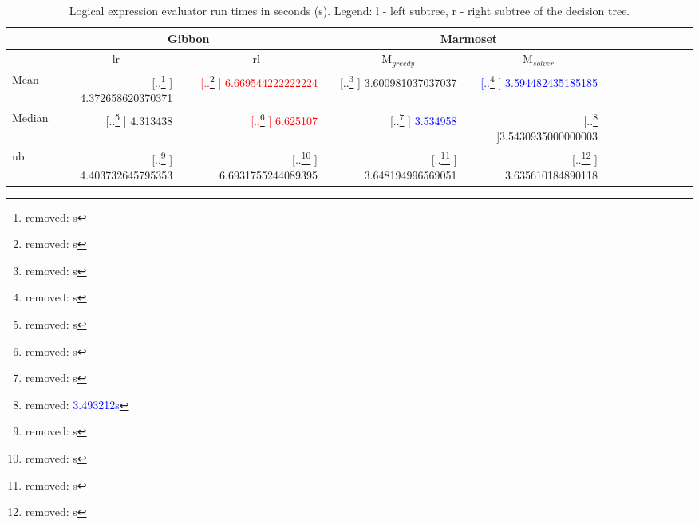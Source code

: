 \documentclass[acmsmall,review,anonymous]{acmart}\settopmatter{printfolios=true,printccs=false,printacmref=false}
\newcommand{\system}{{\sc Marmoset}\xspace}
\newcommand{\systemSolver}{{\sc M$_{\mathit{solver}}$}\xspace} %
\newcommand{\systemGreedy}{{\sc M$_{\mathit{greedy}}$}\xspace} %
\newcommand{\gibbon}{{\sc Gibbon}\xspace}
\newcommand{\ra}[1]{\renewcommand{\arraystretch}{#1}}
\newcommand{\snum}[1]{{\num[round-precision=3,round-mode=figures,scientific-notation=true,output-exponent-marker = e]{#1}}}
\newcommand{\fnumthree}[1]{ {\num[round-mode=places,round-precision=3, scientific-notation=false]{#1}}}
\providecommand{\DIFaddtex}[1]{{\protect\color{blue} \sf #1}} %
\providecommand{\DIFdeltex}[1]{{\protect\color{red} [..\footnote{removed: #1} ]}} %
\providecommand{\DIFaddFL}[1]{\DIFadd{#1}} %
\providecommand{\DIFdelFL}[1]{\DIFdel{#1}} %
\providecommand{\DIFaddbeginFL}{} %
\providecommand{\DIFaddendFL}{} %
\providecommand{\DIFdelbeginFL}{} %
\providecommand{\DIFdelendFL}{} %
\providecommand{\DIFadd}[1]{\texorpdfstring{\DIFaddtex{#1}}{#1}} %
\providecommand{\DIFdel}[1]{\texorpdfstring{\DIFdeltex{#1}}{}} %
\newcommand{\DIFscaledelfig}{0.5}
\newlength{\DIFdelgraphicswidth} %
\newlength{\DIFdelgraphicsheight} %
\newcommand{\DIFaddincludegraphics}[2][]{{\color{blue}\fbox{\DIFOincludegraphics[#1]{#2}}}} %
\newcommand{\DIFdelincludegraphics}[2][]{%
\sbox{\DIFdelgraphicsbox}{\DIFOincludegraphics[#1]{#2}}%
\settoboxwidth{\DIFdelgraphicswidth}{\DIFdelgraphicsbox} %
\settoboxtotalheight{\DIFdelgraphicsheight}{\DIFdelgraphicsbox} %
\scalebox{\DIFscaledelfig}{%
\parbox[b]{\DIFdelgraphicswidth}{\usebox{\DIFdelgraphicsbox}\\[-\baselineskip] \rule{\DIFdelgraphicswidth}{0em}}\llap{\resizebox{\DIFdelgraphicswidth}{\DIFdelgraphicsheight}{%
\setlength{\unitlength}{\DIFdelgraphicswidth}%
\begin{picture}(1,1)%
\thicklines\linethickness{2pt} %
{\color[rgb]{1,0,0}\put(0,0){\framebox(1,1){}}}%
{\color[rgb]{1,0,0}\put(0,0){\line( 1,1){1}}}%
{\color[rgb]{1,0,0}\put(0,1){\line(1,-1){1}}}%
\end{picture}%
}\hspace*{3pt}}} %
} %
\DeclareRobustCommand{\DIFaddbeginFL}{\DIFOaddbeginFL \let\includegraphics\DIFaddincludegraphics} %
\DeclareRobustCommand{\DIFaddendFL}{\DIFOaddendFL \let\includegraphics\DIFOincludegraphics} %
\DeclareRobustCommand{\DIFdelbeginFL}{\DIFOdelbeginFL \let\includegraphics\DIFdelincludegraphics} %
\DeclareRobustCommand{\DIFdelendFL}{\DIFOaddendFL \let\includegraphics\DIFOincludegraphics} %
\begin{document}
\begin{table}[]
	\setlength{\tabcolsep}{2pt} \centering
	\ra{1}
	\caption{Logical expression evaluator run times \DIFaddbeginFL \DIFaddFL{in seconds (s)}\DIFaddendFL .
	Legend: l - left subtree, r - right subtree  of the decision tree.}
	\begin{tabular}{@{}p{0.6in}rcrcrcrcrcrcrcr@{}}\toprule
	 & \multicolumn{3}{|c|}{{\gibbon}} &
	 & \multicolumn{3}{c|}{{\system}}\\ \midrule

	 & \multicolumn{1}{c}{{lr}} & 
	 & \multicolumn{1}{c}{{rl}} &
	 & \multicolumn{1}{c}{\small{\systemGreedy}} &
	 & \multicolumn{1}{c}{\small{\systemSolver}}\\ \midrule
	Mean
	         &   \DIFdelbeginFL %
\DIFdelFL{s
			 }\DIFdelendFL \DIFaddbeginFL \fnumthree{4.372658620370371}
			 \DIFaddendFL &&   \textcolor{red}{\DIFdelbeginFL %
\DIFdelFL{s}\DIFdelendFL \DIFaddbeginFL \fnumthree{6.669544222222224}\DIFaddendFL }
			 &&   \DIFdelbeginFL %
\DIFdelFL{s
			 }\DIFdelendFL \DIFaddbeginFL \fnumthree{3.600981037037037}
			 \DIFaddendFL &&   \textcolor{blue}{\DIFdelbeginFL %
\DIFdelFL{s}\DIFdelendFL \DIFaddbeginFL \fnumthree{3.594482435185185}\DIFaddendFL }

			\\
	Median
	        &  \DIFdelbeginFL %
\DIFdelFL{s
			}\DIFdelendFL \DIFaddbeginFL \fnumthree{4.313438}
			\DIFaddendFL &&   \textcolor{red}{\DIFdelbeginFL %
\DIFdelFL{s}\DIFdelendFL \DIFaddbeginFL \fnumthree{6.625107}\DIFaddendFL }
			&&    \DIFdelbeginFL %
\DIFdelFL{s
			}\DIFdelendFL \DIFaddbeginFL \DIFaddFL{\textcolor{blue}{\fnumthree{3.534958}}
			}\DIFaddendFL &&  \DIFdelbeginFL \DIFdelFL{\textcolor{blue}{\snum{3.493212}s}
}\DIFdelendFL \DIFaddbeginFL {\fnumthree{3.5430935000000003}}
\DIFaddendFL 

			\\
ub          
	               &    \DIFdelbeginFL %
\DIFdelFL{s
				   }\DIFdelendFL \DIFaddbeginFL \fnumthree{4.403732645795353}
				   \DIFaddendFL &&    \DIFdelbeginFL %
\DIFdelFL{s
				   }\DIFdelendFL \DIFaddbeginFL \fnumthree{6.6931755244089395}
				   \DIFaddendFL &&    \DIFdelbeginFL %
\DIFdelFL{s
				   }\DIFdelendFL \DIFaddbeginFL \fnumthree{3.648194996569051}
				   \DIFaddendFL &&    \DIFdelbeginFL %
\DIFdelFL{s
}\DIFdelendFL \DIFaddbeginFL \fnumthree{3.635610184890118}
\DIFaddendFL 


\end{tabular}
\end{table}
\end{document}
